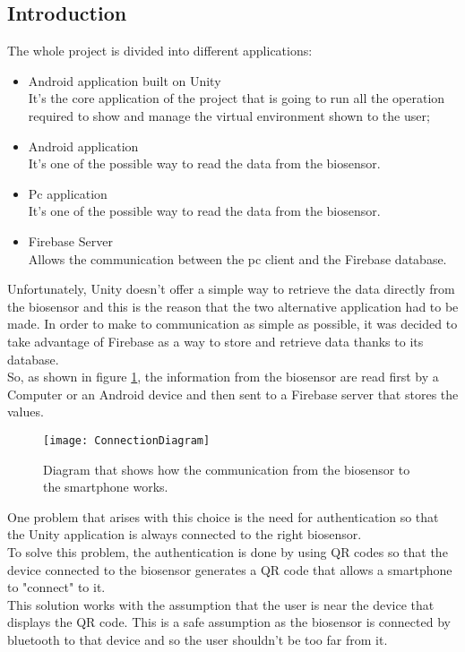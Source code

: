 \subsection{Introduction}
The whole project is divided into different applications:
\begin{itemize}
	\item Android application built on Unity\\It's the core application of the project that is going to run all the operation required to show and manage the virtual environment shown to the user;
	\item Android application\\It's one of the possible way to read the data from the biosensor.
	\item Pc application\\It's one of the possible way to read the data from the biosensor.
	\item Firebase Server\\Allows the communication between the pc client and the Firebase database.
\end{itemize}

Unfortunately, Unity doesn't offer a simple way to retrieve the data directly from the biosensor and this is the reason that the two alternative application had to be made.
In order to make to communication as simple as possible, it was decided to take advantage of Firebase as a way to store and retrieve data thanks to its database.\\
So, as shown in figure \ref{fig:communication}, the information from the biosensor are read first by a Computer or an Android device and then sent to a Firebase server that stores the values.
\begin{figure}[H]
	\centering
	\texttt{[image: ConnectionDiagram]}
	\caption{Diagram that shows how the communication from the biosensor to the smartphone works.}\label{fig:communication}
\end{figure}
One problem that arises with this choice is the need for authentication so that the Unity application is always connected to the right biosensor.\\
To solve this problem, the authentication is done by using QR codes so that the device connected to the biosensor generates a QR code that allows a smartphone to "connect" to it.\\
This solution works with the assumption that the user is near the device that displays the QR code. This is a safe assumption as the biosensor is connected by bluetooth to that device and so the user shouldn't be too far from it.

